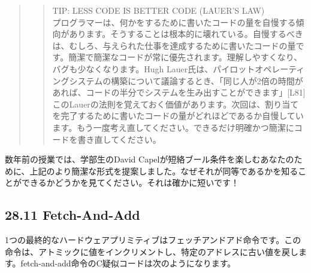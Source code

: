 \begin{quote}
\begin{quote}
TIP: LESS CODE IS BETTER CODE (LAUER'S LAW)\\
プログラマーは、何かをするために書いたコードの量を自慢する傾向があります。そうすることは根本的に壊れている。自慢するべきは、むしろ、与えられた仕事を達成するために書いたコードの量です。簡潔で簡潔なコードが常に優先されます。理解しやすくなり、バグも少なくなります。Hugh
Lauer氏は、パイロットオペレーティングシステムの構築について議論するとき、「同じ人が2倍の時間があれば、コードの半分でシステムを生み出すことができます」{[}L81{]}このLauerの法則を覚えておく価値があります。次回は、割り当てを完了するために書いたコードの量がどれほどであるか自慢しています。もう一度考え直してください。できるだけ明確かつ簡潔にコードを書き直してください。
\end{quote}
\end{quote}

数年前の授業では、学部生のDavid
Capelが短絡ブール条件を楽しむあなたのために、上記のより簡潔な形式を提案しました。なぜそれが同等であるかを知ることができるかどうかを見てください。それは確かに短いです！

\begin{Shaded}
\begin{Highlighting}[]
 
   \NormalTok{))}
\NormalTok{       ; }
\NormalTok{ \}}
\end{Highlighting}
\end{Shaded}

\hypertarget{fetch-and-add}{%
\subsection*{28.11 Fetch-And-Add}\label{fetch-and-add}}

1つの最終的なハードウェアプリミティブはフェッチアンドアド命令です。この命令は、アトミックに値をインクリメントし、特定のアドレスに古い値を戻します。fetch-and-add命令のC疑似コードは次のようになります。

\begin{Shaded}
\begin{Highlighting}[]
 
   
\NormalTok{;}
   
\NormalTok{ \}}
\end{Highlighting}
\end{Shaded}

